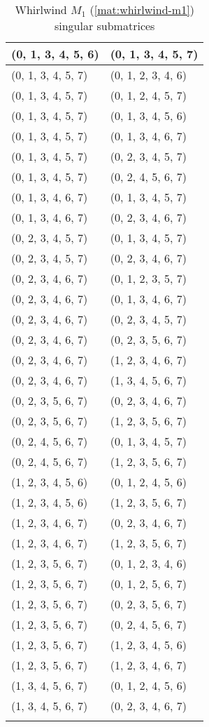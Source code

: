 \begin{footnotesize}
\begin{longtable}[c]{|l|l|}
\\ \hline
(0, 1, 3, 4, 5, 6)
&(0, 1, 3, 4, 5, 7)
\\ \hline
(0, 1, 3, 4, 5, 7)
&(0, 1, 2, 3, 4, 6)
\\ \hline
(0, 1, 3, 4, 5, 7)
&(0, 1, 2, 4, 5, 7)
\\ \hline
(0, 1, 3, 4, 5, 7)
&(0, 1, 3, 4, 5, 6)
\\ \hline
(0, 1, 3, 4, 5, 7)
&(0, 1, 3, 4, 6, 7)
\\ \hline
(0, 1, 3, 4, 5, 7)
&(0, 2, 3, 4, 5, 7)
\\ \hline
(0, 1, 3, 4, 5, 7)
&(0, 2, 4, 5, 6, 7)
\\ \hline
(0, 1, 3, 4, 6, 7)
&(0, 1, 3, 4, 5, 7)
\\ \hline
(0, 1, 3, 4, 6, 7)
&(0, 2, 3, 4, 6, 7)
\\ \hline
(0, 2, 3, 4, 5, 7)
&(0, 1, 3, 4, 5, 7)
\\ \hline
(0, 2, 3, 4, 5, 7)
&(0, 2, 3, 4, 6, 7)
\\ \hline
(0, 2, 3, 4, 6, 7)
&(0, 1, 2, 3, 5, 7)
\\ \hline
(0, 2, 3, 4, 6, 7)
&(0, 1, 3, 4, 6, 7)
\\ \hline
(0, 2, 3, 4, 6, 7)
&(0, 2, 3, 4, 5, 7)
\\ \hline
(0, 2, 3, 4, 6, 7)
&(0, 2, 3, 5, 6, 7)
\\ \hline
(0, 2, 3, 4, 6, 7)
&(1, 2, 3, 4, 6, 7)
\\ \hline
(0, 2, 3, 4, 6, 7)
&(1, 3, 4, 5, 6, 7)
\\ \hline
(0, 2, 3, 5, 6, 7)
&(0, 2, 3, 4, 6, 7)
\\ \hline
(0, 2, 3, 5, 6, 7)
&(1, 2, 3, 5, 6, 7)
\\ \hline
(0, 2, 4, 5, 6, 7)
&(0, 1, 3, 4, 5, 7)
\\ \hline
(0, 2, 4, 5, 6, 7)
&(1, 2, 3, 5, 6, 7)
\\ \hline
(1, 2, 3, 4, 5, 6)
&(0, 1, 2, 4, 5, 6)
\\ \hline
(1, 2, 3, 4, 5, 6)
&(1, 2, 3, 5, 6, 7)
\\ \hline
(1, 2, 3, 4, 6, 7)
&(0, 2, 3, 4, 6, 7)
\\ \hline
(1, 2, 3, 4, 6, 7)
&(1, 2, 3, 5, 6, 7)
\\ \hline
(1, 2, 3, 5, 6, 7)
&(0, 1, 2, 3, 4, 6)
\\ \hline
(1, 2, 3, 5, 6, 7)
&(0, 1, 2, 5, 6, 7)
\\ \hline
(1, 2, 3, 5, 6, 7)
&(0, 2, 3, 5, 6, 7)
\\ \hline
(1, 2, 3, 5, 6, 7)
&(0, 2, 4, 5, 6, 7)
\\ \hline
(1, 2, 3, 5, 6, 7)
&(1, 2, 3, 4, 5, 6)
\\ \hline
(1, 2, 3, 5, 6, 7)
&(1, 2, 3, 4, 6, 7)
\\ \hline
(1, 3, 4, 5, 6, 7)
&(0, 1, 2, 4, 5, 6)
\\ \hline
(1, 3, 4, 5, 6, 7)
&(0, 2, 3, 4, 6, 7)
\\ \hline
\caption{Whirlwind $M_1$ (\ref{mat:whirlwind-m1}) singular submatrices}\label{tbl:m1-singular}
\end{longtable}
\end{footnotesize}
